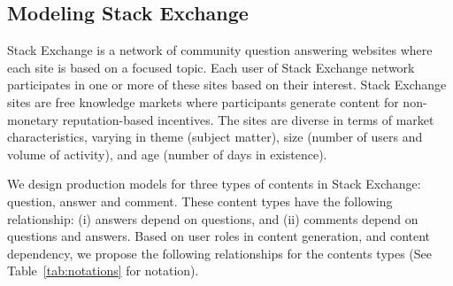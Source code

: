 \subsection{Modeling Stack Exchange}
Stack Exchange is a network of community question answering websites where each site is based on a focused topic. Each user of Stack Exchange network participates in one or more of these sites based on their interest. Stack Exchange sites are free knowledge markets where participants generate content for non-monetary reputation-based incentives. The sites are diverse in terms of market characteristics, varying in theme (subject matter), size (number of users and volume of activity), and age (number of days in existence). 

We design production models for three types of contents in Stack Exchange: question, answer and comment. These content types have the following relationship: (i) answers depend on questions, and (ii) comments depend on questions and answers. Based on user roles in content generation, and content dependency, we propose the following relationships for the contents types (See Table~\ref{tab:notations} for notation).

